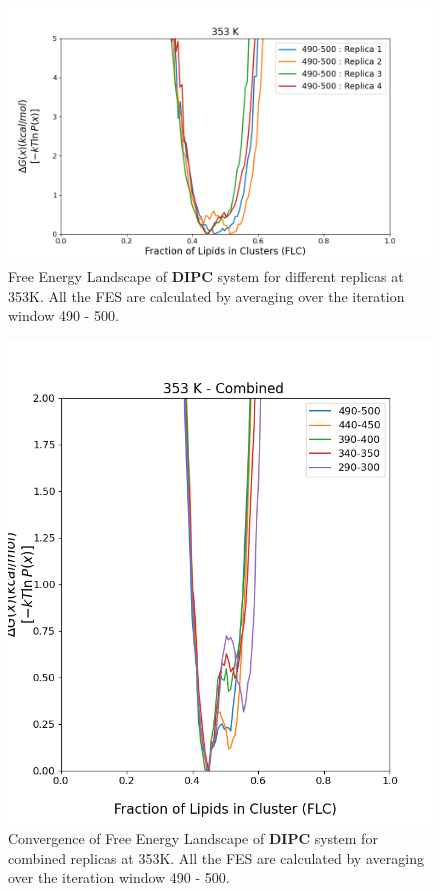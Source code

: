 \documentclass{biophys-new}
\begin{document}

\begin{figure}[hbt!]
\centering
\includegraphics[width=1.1\linewidth]{all_plots/ClusterLipids2Total/DPPC_DIPC_CHOL/353K/Average_DIPC_353_ClusterLipids2Total.png}
\caption{Free Energy Landscape of \textbf{DIPC} system for different replicas at 353K. All the FES are calculated by averaging over the iteration window 490 - 500.}
\label{fig:view}

\end{figure}

\begin{figure}[hbt!]
\centering
\includegraphics[width=0.6\linewidth]{all_plots/ClusterLipids2Total/DPPC_DIPC_CHOL/353K/Convergence_DIPC_MULTI__353_ClusterLipids2Total.png}
\caption{Convergence of Free Energy Landscape of \textbf{DIPC} system for combined replicas at 353K. All the FES are calculated by averaging over the iteration window 490 - 500.}
\label{fig:view}

\end{figure}
\end{document}
